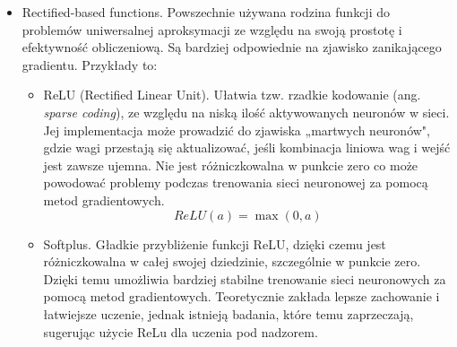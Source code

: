 \begin{description}
\begin{itemize}
\begin{itemize}
                    \item Sigmoidalna. Najczęściej używana. Stanowi kompromis między zachowaniami liniowymi a nieliniowymi. \cite{haykin2009neural}
                    \[\sigma(a) = \frac{1}{1 + e^{-a}}\]
                    \item Signum. Funkcja aktywacji signum jest podobna do funkcji skoku jednostkowego, ale zamiast przyjmować wartości 0 i 1, przyjmuje wartości -1 i 1. Jest to funkcja nieciągła, która zmienia swoją wartość w punkcie zero. Ze względu na brak różniczkowalności w punkcie zero, funkcja signum jest rzadko stosowana w praktyce do trenowania sieci neuronowych za pomocą metod gradientowych.
                    \[\operatorname{sgn}(a) = \begin{cases}
                                            -1, & a < 0, \\
                                            0, & a = 0, \\
                                            1, & a > 0
                                        \end{cases}\]
                    \item Hiperboliczna tangens (tanh). Funkcja ta jest podobna do sigmoidalnej, ale jej wartości wyjściowe mieszczą się w zakresie od -1 do Funkcja tanh jest różniczkowalna i ma korzystne właściwości gradientowe, co czyni ją popularnym wyborem w sieciach neuronowych.
                    \[\tanh(a) = \frac{1-e^{-2a}}{1+e^{-2a}}\]
                \end{itemize}
            \item Rectified-based functions. Powszechnie używana rodzina funkcji do problemów uniwersalnej aproksymacji ze względu na swoją prostotę i efektywność obliczeniową. Są bardziej odpowiednie na zjawisko zanikającego gradientu. Przykłady to:
                \begin{itemize}
                    \item ReLU (Rectified Linear Unit). Ułatwia tzw. rzadkie kodowanie (ang. \textit{sparse coding}), ze względu na niską ilość aktywowanych neuronów w sieci. Jej implementacja może prowadzić do zjawiska „martwych neuronów", gdzie wagi przestają się aktualizować, jeśli kombinacja liniowa wag i wejść jest zawsze ujemna. Nie jest różniczkowalna w punkcie zero co może powodować problemy podczas trenowania sieci neuronowej za pomocą metod gradientowych.
                     \[ReLU(a) = \max(0, a)\]
                    \item Softplus. Gładkie przybliżenie funkcji ReLU, dzięki czemu jest różniczkowalna w całej swojej dziedzinie, szczególnie w punkcie zero. Dzięki temu umożliwia bardziej stabilne trenowanie sieci neuronowych za pomocą metod gradientowych. Teoretycznie zakłada lepsze zachowanie i łatwiejsze uczenie, jednak istnieją badania, które temu zaprzeczają, sugerując użycie ReLu dla uczenia pod nadzorem.

\end{itemize}
\end{itemize}
\end{description}
